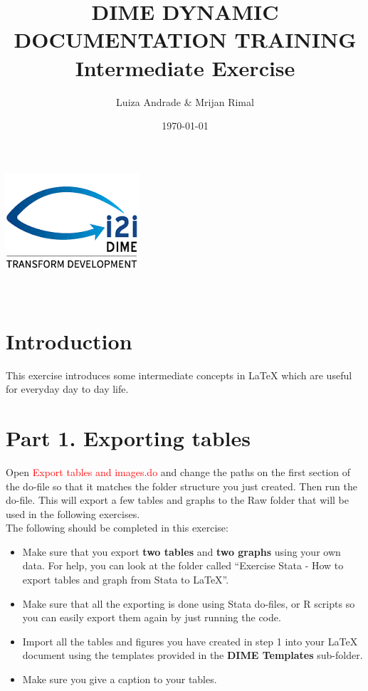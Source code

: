 \documentclass[12pts]{report}
\title{DIME DYNAMIC DOCUMENTATION TRAINING \\ Intermediate Exercise }
\author{Luiza Andrade \& Mrijan Rimal}
\date{\today}
\begin{document}
	
	
	\makeatletter
	\begin{titlepage}
		\begin{center}
			\includegraphics[width=0.3\linewidth]{../img/i2i.png}\\[10ex]
			{\LARGE \bfseries  \@title }\\[2ex] 
			{\Large  \@author}\\[20ex] 
			{\large \@date}
		\end{center}
	\end{titlepage}
	\makeatother
	
\section*{Introduction}
This exercise introduces some intermediate concepts in {\LaTeX} which are useful for everyday day to day life. 

\section*{Part 1. Exporting tables}
Open \textcolor{red}{Export tables and images.do} and change the paths on the first section of the do-file so that it matches the folder structure you just created. Then run the do-file. This will export a few tables and graphs to the Raw folder that will be used in the following exercises.  \\

The following should be completed in this exercise: 
\begin{itemize}
	\item Make sure that you export \textbf{two tables} and \textbf{two graphs} using your own data. For help, you can look at the folder called ``Exercise Stata - How to export tables and graph from Stata to LaTeX''.
	\item Make sure that all the exporting is done using Stata do-files, or R scripts so you can easily export them again by just running the code. 
	\item Import all the tables and figures you have created in step 1 into your {\LaTeX} document using the templates provided in the \textbf{DIME Templates} sub-folder.
	\item Make sure you give a caption to your tables. 
\end{itemize}
\end{document}
